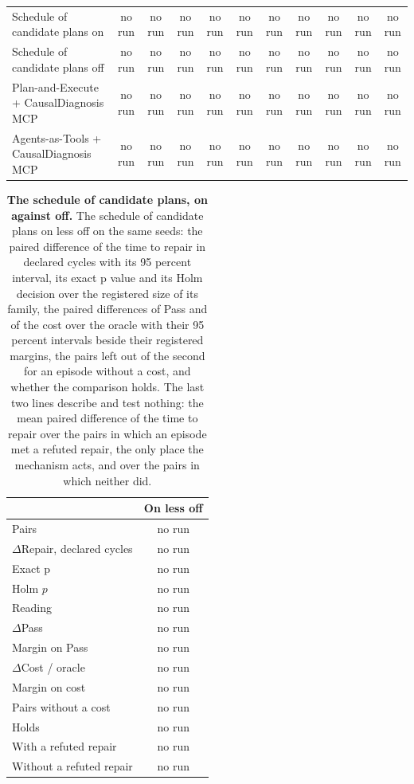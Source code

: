 \documentclass[10pt]{article}
\begin{document}
\begin{table}[H]
\begin{tabular}{lcccccccccc}
\midrule
Schedule of candidate plans on & no run & no run & no run & no run & no run & no run & no run & no run & no run & no run \\
Schedule of candidate plans off & no run & no run & no run & no run & no run & no run & no run & no run & no run & no run \\
\midrule
Plan-and-Execute + CausalDiagnosis MCP & no run & no run & no run & no run & no run & no run & no run & no run & no run & no run \\
Agents-as-Tools + CausalDiagnosis MCP & no run & no run & no run & no run & no run & no run & no run & no run & no run & no run \\
\bottomrule
\end{tabular}
\end{table}
\vspace{-8pt}
\begin{table}[H]\centering\footnotesize
\caption{\textbf{The schedule of candidate plans, on against off.} The schedule of candidate plans on less off on the same seeds: the paired difference of the time to repair in declared cycles with its 95 percent interval, its exact p value and its Holm decision over the registered size of its family, the paired differences of Pass and of the cost over the oracle with their 95 percent intervals beside their registered margins, the pairs left out of the second for an episode without a cost, and whether the comparison holds. The last two lines describe and test nothing: the mean paired difference of the time to repair over the pairs in which an episode met a refuted repair, the only place the mechanism acts, and over the pairs in which neither did.}
\label{tab:parallelpair}
\setlength{\tabcolsep}{3pt}
\begin{tabular}{lc}
\toprule
 & On less off \\
\midrule
Pairs & no run \\
$\Delta$Repair, declared cycles & no run \\
Exact p & no run \\
Holm $p$ & no run \\
Reading & no run \\
$\Delta$Pass & no run \\
Margin on Pass & no run \\
$\Delta$Cost / oracle & no run \\
Margin on cost & no run \\
Pairs without a cost & no run \\
Holds & no run \\
With a refuted repair & no run \\
Without a refuted repair & no run \\
\bottomrule
\end{tabular}
\end{table}
\vspace{-8pt}
\end{document}
